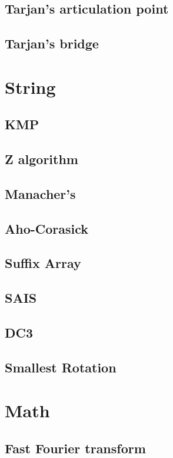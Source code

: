 \documentclass[a4paper,10pt,twocolumn,oneside]{article}
\begin{document}
\subsection{Tarjan's articulation point}

\subsection{Tarjan's bridge}

\section{String}
\subsection{KMP}

\subsection{Z algorithm}

\subsection{Manacher's}

\subsection{Aho-Corasick}

\subsection{Suffix Array}

\subsection{SAIS}

\subsection{DC3}

\subsection{Smallest Rotation}

\section{Math}
\subsection{Fast Fourier transform}

\end{document}
